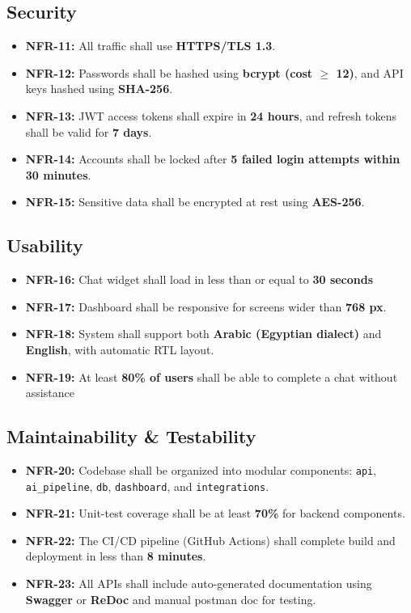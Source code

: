 \documentclass[12pt,a4paper]{article}
\begin{document}
\subsection{ Security}

\begin{itemize}[leftmargin=2cm]
    \item \textbf{NFR-11:} All traffic shall use \textbf{HTTPS/TLS 1.3}.
\item \textbf{NFR-12:} Passwords shall be hashed using \textbf{bcrypt (cost $\geq$ 12)}, and API keys hashed using \textbf{SHA-256}.

    \item \textbf{NFR-13:} JWT access tokens shall expire in \textbf{24 hours}, and refresh tokens shall be valid for \textbf{7 days}.
    \item \textbf{NFR-14:} Accounts shall be locked after \textbf{5 failed login attempts within 30 minutes}.
    \item \textbf{NFR-15:} Sensitive data shall be encrypted at rest using \textbf{AES-256}.
\end{itemize}

\subsection{ Usability}

\begin{itemize}[leftmargin=2cm]
    \item \textbf{NFR-16:} Chat widget shall load in less than or equal to \textbf{30 seconds}
    \item \textbf{NFR-17:} Dashboard shall be responsive for screens wider than \textbf{768 px}.
    \item \textbf{NFR-18:} System shall support both \textbf{Arabic (Egyptian dialect)} and \textbf{English}, with automatic RTL layout.
    \item \textbf{NFR-19:} At least \textbf{80\% of users} shall be able to complete a chat without assistance
\end{itemize}

\subsection{Maintainability \& Testability}

\begin{itemize}[leftmargin=2cm]
    \item \textbf{NFR-20:} Codebase shall be organized into modular components: \texttt{api}, \texttt{ai\_pipeline}, \texttt{db}, \texttt{dashboard}, and \texttt{integrations}.
    \item \textbf{NFR-21:} Unit-test coverage shall be at least \textbf{70\%} for backend components.
    \item \textbf{NFR-22:} The CI/CD pipeline (GitHub Actions) shall complete build and deployment in less than \textbf{8 minutes}.
    \item \textbf{NFR-23:} All APIs shall include auto-generated documentation using \textbf{Swagger} or \textbf{ReDoc} and manual postman doc for testing.
\end{itemize}
\end{document}
